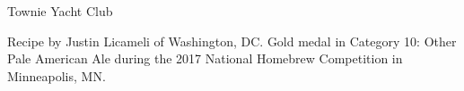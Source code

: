 \begin{recipe}{Townie Yacht Club} %

\begin{aboutblock}
Recipe by Justin Licameli of Washington, DC. Gold medal in Category 10: Other Pale
American Ale during the 2017 National Homebrew Competition in Minneapolis, MN.
\sourceaha
\end{aboutblock}


\begin{methodandtiming}

\begin{mashsteps}
\end{mashsteps}

\begin{fermentationsteps}
\end{fermentationsteps}

\end{methodandtiming}

\recipebreak

\begin{ingredientsblock}

\begin{malts}
\end{malts}

\begin{hops}
\end{hops}


\end{ingredientsblock}

\end{recipe}


